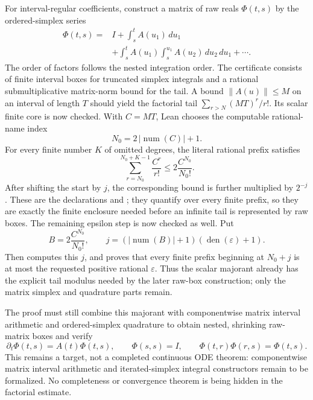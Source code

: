 \begin{theorem}
\label{thm:peano-baker-state-transition}
For interval-regular coefficients, construct a matrix of raw reals
\(\Phi(t,s)\) by the ordered-simplex series
\begin{align*}
 \Phi(t,s)={}&I+\int_s^t A(u_1)\,du_1\\
 &+\int_s^t A(u_1)\int_s^{u_1}A(u_2)\,du_2\,du_1+\cdots.
\end{align*}
The order of factors follows the nested integration order. The certificate
consists of finite interval boxes for truncated simplex integrals and a
rational submultiplicative matrix-norm bound for the tail. A bound
\(\lVert A(u)\rVert\le M\) on an interval of length \(T\) should yield the
factorial tail \(\sum_{r>N}(MT)^r/r!\).  Its scalar finite core is now
checked.  With \(C=MT\), Lean chooses the computable rational-name index
\[
 N_0=2\,|\operatorname{num}(C)|+1.
\]
For every finite number \(K\) of omitted degrees, the literal rational
prefix satisfies
\[
 \sum_{r=N_0}^{N_0+K-1}\frac{C^r}{r!}
 \le 2\frac{C^{N_0}}{N_0!}.
\]
After shifting the start by \(j\), the corresponding bound is further
multiplied by \(2^{-j}\).  These are the declarations
 and
; they quantify over every
finite prefix, so they are exactly the finite enclosure needed before an
infinite tail is represented by raw boxes.  The remaining epsilon step is now
checked as well.  Put
\[
 B=2\frac{C^{N_0}}{N_0!},\qquad
 j=(|\operatorname{num}(B)|+1)(\operatorname{den}(\varepsilon)+1).
\]
Then  computes this \(j\), and
 proves that every finite
prefix beginning at \(N_0+j\) is at most the requested positive rational
\(\varepsilon\).  Thus the scalar majorant already has the explicit
tail modulus needed by the later raw-box construction; only the matrix
simplex and quadrature parts remain.

The proof must still combine this majorant with componentwise matrix interval
arithmetic and ordered-simplex quadrature to obtain nested, shrinking
raw-matrix boxes and verify
\[
 \partial_t\Phi(t,s)=A(t)\Phi(t,s),\qquad \Phi(s,s)=I,
\qquad \Phi(t,r)\Phi(r,s)=\Phi(t,s).
\]
This remains a target, not a completed continuous ODE theorem: componentwise
matrix interval arithmetic and iterated-simplex integral constructors remain
to be formalized.  No completeness or convergence theorem is being hidden in
the factorial estimate.
\end{theorem}

